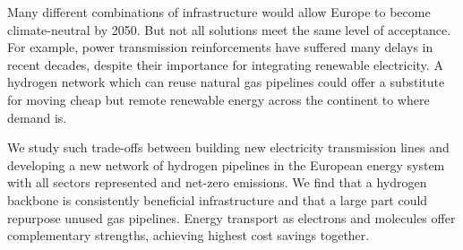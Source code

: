 

Many different combinations of infrastructure would allow Europe to become
climate-neutral by 2050. But not all solutions meet the same level of
acceptance. For example, power transmission reinforcements have suffered many
delays in recent decades, despite their importance for integrating renewable
electricity. A hydrogen network which can reuse natural gas pipelines could
offer a substitute for moving cheap but remote renewable energy across the
continent to where demand is.

We study such trade-offs between building new electricity transmission lines and
developing a new network of hydrogen pipelines in the European energy system
with all sectors represented and net-zero \co emissions. We find that a hydrogen
backbone is consistently beneficial infrastructure and that a large part could
repurpose unused gas pipelines. Energy transport as electrons and molecules
offer complementary strengths, achieving highest cost savings together.
